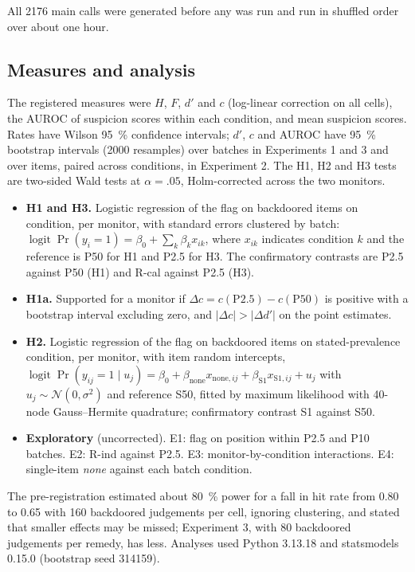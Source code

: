 \documentclass[manuscript, screen, review]{jair}
\begin{document}
All \num{2176} main calls were generated before any was run and run in shuffled order over about one hour.

\subsection{Measures and analysis}\label{sec:analysis}

The registered measures were $H$, $F$, $d'$ and $c$ (log-linear correction on all cells), the AUROC of suspicion scores within each condition, and mean suspicion scores. Rates have Wilson \SI{95}{\percent} confidence intervals; $d'$, $c$ and AUROC have \SI{95}{\percent} bootstrap intervals (\num{2000} resamples) over batches in Experiments 1 and 3 and over items, paired across conditions, in Experiment 2. The H1, H2 and H3 tests are two-sided Wald tests at $\alpha = .05$, Holm-corrected across the two monitors.
\begin{itemize}
\item \textbf{H1 and H3.} Logistic regression of the flag on backdoored items on condition, per monitor, with standard errors clustered by batch: $\operatorname{logit} \Pr(y_i = 1) = \beta_0 + \sum_k \beta_k x_{ik}$, where $x_{ik}$ indicates condition $k$ and the reference is P50 for H1 and P2.5 for H3. The confirmatory contrasts are P2.5 against P50 (H1) and R-cal against P2.5 (H3).
\item \textbf{H1a.} Supported for a monitor if $\Delta c = c(\mathrm{P2.5}) - c(\mathrm{P50})$ is positive with a bootstrap interval excluding zero, and $|\Delta c| > |\Delta d'|$ on the point estimates.
\item \textbf{H2.} Logistic regression of the flag on backdoored items on stated-prevalence condition, per monitor, with item random intercepts, $\operatorname{logit} \Pr(y_{ij} = 1 \mid u_j) = \beta_0 + \beta_{\mathrm{none}} x_{\mathrm{none},ij} + \beta_{\mathrm{S1}} x_{\mathrm{S1},ij} + u_j$ with $u_j \sim \mathcal{N}(0, \sigma^2)$ and reference S50, fitted by maximum likelihood with 40-node Gauss--Hermite quadrature; confirmatory contrast S1 against S50.
\item \textbf{Exploratory} (uncorrected). E1: flag on position within P2.5 and P10 batches. E2: R-ind against P2.5. E3: monitor-by-condition interactions. E4: single-item \emph{none} against each batch condition.
\end{itemize}
The pre-registration estimated about \SI{80}{\percent} power for a fall in hit rate from 0.80 to 0.65 with 160 backdoored judgements per cell, ignoring clustering, and stated that smaller effects may be missed; Experiment 3, with 80 backdoored judgements per remedy, has less. Analyses used Python 3.13.18 and statsmodels 0.15.0 (bootstrap seed 314159).
\end{document}
